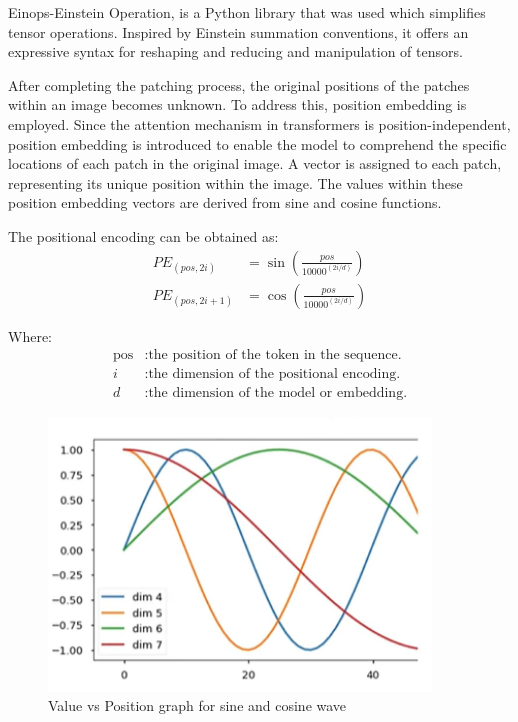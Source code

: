 \noindent Einops-Einstein Operation, is a Python library that was used which simplifies tensor operations. Inspired by Einstein summation conventions, it offers an expressive syntax for reshaping and reducing and manipulation of tensors.

\noindent After completing the patching process, the original positions of the patches within an image becomes unknown. To address this, position embedding is employed. Since the attention mechanism in transformers is position-independent, position embedding is introduced to enable the model to comprehend the specific locations of each patch in the original image. A vector is assigned to each patch, representing its unique position within the image. The values within these position embedding vectors are derived from sine and cosine functions.

\noindent The positional encoding can be obtained as:
\begin{align}
    PE_{(pos, 2i)}   & = \sin\left(\frac{pos}{{10000}^{(2i/d)}}\right) \label{eq:pos_encoding_sin} \\
    PE_{(pos, 2i+1)} & = \cos\left(\frac{pos}{{10000}^{(2i/d)}}\right) \label{eq:pos_encoding_cos}
\end{align}

\noindent Where:
\begin{align*}
    \text{pos} & : \text{the position of the token in the sequence.} \\
    i          & : \text{the dimension of the positional encoding.}  \\
    d          & : \text{the dimension of the model or embedding.}
\end{align*}

\begin{figure}[htbp]
    \centering
    \includegraphics[width=4in]{img/plot for sine and cosine wave.png}
    \caption{{Value vs Position graph for sine and cosine wave}}
\end{figure}

